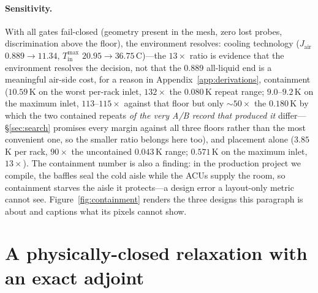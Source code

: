 \documentclass{article}
\newcommand{\Jair}{J_{\mathrm{air}}}
\begin{document}
\paragraph{Sensitivity.}
With all gates fail-closed (geometry present in the mesh, zero lost probes,
discrimination above the floor), the environment resolves: cooling technology
($\Jair$ $0.889 \to 11.34$, $T^{\max}_{\mathrm{in}}$ $20.95 \to 36.75$\,C)---the $13\times$ ratio is evidence that the
environment resolves the decision, not that the $0.889$ all-liquid end is a meaningful
air-side cost, for a reason in Appendix~\ref{app:derivations},
containment ($10.59$\,K on the worst per-rack inlet, $132\times$ the $0.080$\,K
repeat range; $9.0$--$9.2$\,K on the maximum inlet, $113$--$115\times$ against that
floor but only ${\sim}50\times$ the $0.180$\,K by which the two contained repeats
\emph{of the very A/B record that produced it} differ---\S\ref{sec:search} promises
every margin against all three floors rather than the most convenient one, so the
smaller ratio belongs here too), and
placement alone ($3.85$\,K per rack, $90\times$ the uncontained $0.043$\,K range;
$0.571$\,K on the maximum inlet, $13\times$).  The containment number
is also a finding: in the production project we compile, the baffles seal the
cold aisle while the ACUs supply the room, so containment starves the aisle it
protects---a design error a layout-only metric cannot see.
Figure~\ref{fig:containment} renders the three designs this paragraph is about and
captions what its pixels cannot show.

\section{A physically-closed relaxation with an exact adjoint}
\label{sec:relax}
\end{document}
